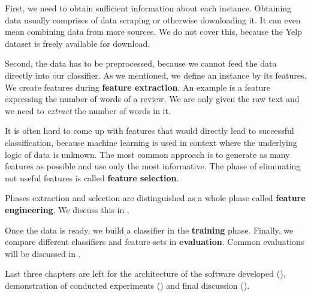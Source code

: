 First, we need to obtain sufficient information about each instance.
Obtaining data usually comprises of data scraping or otherwise downloading it.
It can even mean combining data from more sources.
We do not cover this, because the Yelp dataset is freely available for download.

Second, the data has to be preprocessed, because we cannot feed the data directly into our classifier.
As we mentioned, we define an instance by its features.
We create features during \textbf{feature extraction}.
An example is a feature expressing the number of words of a review.
We are only given the raw text and we need to \textit{extract} the number of words in it.

It is often hard to come up with features that would directly lead to successful classification,
because machine learning is used in context where the underlying logic of data is unknown.
The most common approach is to generate as many features as possible and use only the most informative.
The phase of eliminating not useful features is called \textbf{feature selection}.

Phases extraction and selection are distinguished as a whole phase called \textbf{feature engineering}.
We discuss this in .
 


Once the data is ready, we build a classifier in the \textbf{training} phase.
Finally, we compare different classifiers and feature sets in \textbf{evaluation}.
Common evaluations will be discussed in .

Last three chapters  are left for the architecture of the software developed (),
demonstration of conducted experiments () and final discussion ().






